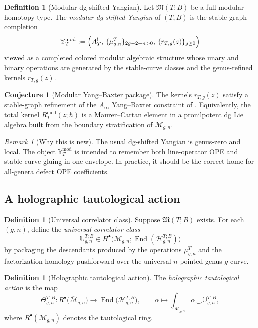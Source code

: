 \documentclass[11pt]{article}
\theoremstyle{definition}
\newtheorem{definition}[theorem]{Definition}
\newtheorem{conjecture}[theorem]{Conjecture}
\theoremstyle{remark}
\newtheorem{remark}[theorem]{Remark}
\newcommand{\Hh}{\mathcal H}
\newcommand{\M}{\mathcal M}
\newcommand{\ModEnv}{\mathfrak M}
\newcommand{\End}{\operatorname{End}}
\newcommand{\modu}{\mathrm{mod}}
\begin{document}
\begin{definition}[Modular dg-shifted Yangian]\label{def:modular-yangian}
Let $\ModEnv(T;B)$ be a full modular homotopy type. The \emph{modular dg-shifted Yangian} of $(T,B)$ is the stable-graph completion
\[
\mathbb Y_T^{\modu}
:=
\Bigl(A_T^!,\,\{\mu^T_{g,n}\}_{2g-2+n>0},\,\{r_{T,g}(z)\}_{g\ge 0}\Bigr)
\]
viewed as a completed colored modular algebraic structure whose unary and binary operations are generated by the stable-curve classes and the genus-refined kernels $r_{T,g}(z)$.
\end{definition}

\begin{conjecture}[Modular Yang--Baxter package]\label{conj:modular-yang-baxter}
The kernels $r_{T,g}(z)$ satisfy a stable-graph refinement of the $A_\infty$ Yang--Baxter constraint of \cite{DNP2025}. Equivalently, the total kernel $R_T^{\modu}(z;\hbar)$ is a Maurer--Cartan element in a pronilpotent dg Lie algebra built from the boundary stratification of $\overline{\M}_{g,n}$.
\end{conjecture}

\begin{remark}[Why this is new]
The usual dg-shifted Yangian is genus-zero and local. The object $\mathbb Y_T^{\modu}$ is intended to remember both line-operator OPE and stable-curve gluing in one envelope. In practice, it should be the correct home for all-genera defect OPE coefficients.
\end{remark}

\subsection{A holographic tautological action}

\begin{definition}[Universal correlator class]\label{def:universal-correlator-class}
Suppose $\ModEnv(T;B)$ exists. For each $(g,n)$, define the \emph{universal correlator class}
\[
\mathbb U^{T;B}_{g,n}
\in
H^\bullet\bigl(\overline{\M}_{g,n};\End(\Hh_{g,n}^{T;B})\bigr)
\]
by packaging the descendants produced by the operations $\mu^T_{g,n}$ and the factorization-homology pushforward over the universal $n$-pointed genus-$g$ curve.
\end{definition}

\begin{definition}[Holographic tautological action]\label{def:tautological-action}
The \emph{holographic tautological action} is the map
\[
\Theta^{T;B}_{g,n}:
R^\bullet\bigl(\overline{\M}_{g,n}\bigr)
\longrightarrow
\End\bigl(\Hh_{g,n}^{T;B}\bigr),
\qquad
\alpha \longmapsto \int_{\overline{\M}_{g,n}} \alpha \smile \mathbb U_{g,n}^{T;B},
\]
where $R^\bullet(\overline{\M}_{g,n})$ denotes the tautological ring.
\end{definition}
\end{document}
